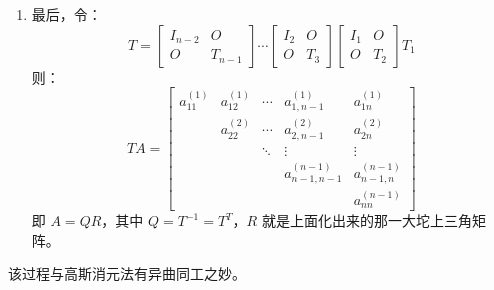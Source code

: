 \begin{enumerate}
    \item 最后，令：
    \[
        T=\begin{bmatrix}I_{n-2}&O\\O&T_{n-1}\end{bmatrix}\cdots\begin{bmatrix}I_{2}&O\\O&T_{3}\end{bmatrix}\begin{bmatrix}I_{1}&O\\O&T_{2}\end{bmatrix}T_1
    \]
    则：
    \[
        TA=\begin{bmatrix}
        a_{11}^{(1)}&a_{12}^{(1)}&\cdots&a_{1,n-1}^{(1)}&a_{1n}^{(1)}\\
        &a_{22}^{(2)}&\cdots&a_{2,n-1}^{(2)}&a_{2n}^{(2)}\\
        &&\ddots&\vdots&\vdots\\
        &&&a_{n-1,n-1}^{(n-1)}&a_{n-1,n}^{(n-1)}\\
        &&&&a_{nn}^{(n-1)}
        \end{bmatrix}
    \]
    即 $A=QR$，其中 $Q=T^{-1}=T^T$，$R$ 就是上面化出来的那一大坨上三角矩阵。
\end{enumerate}

\begin{remark}
该过程与高斯消元法有异曲同工之妙。
\end{remark}

